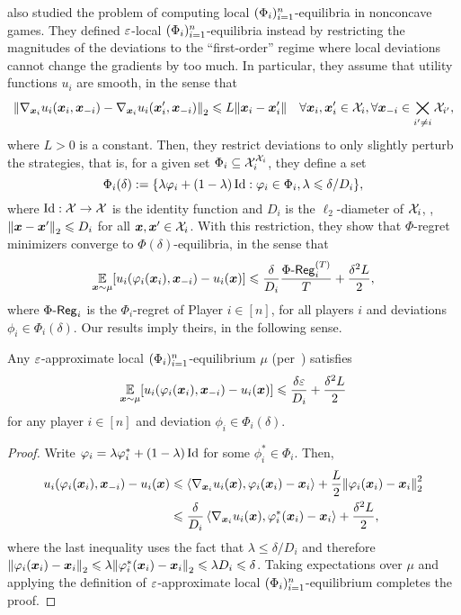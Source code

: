 \citet{Cai24:Tractable} also studied the problem of computing local $(\Phi_i)_{i=1}^n$-equilibria in nonconcave games. They defined $\varepsilon$-local $(\Phi_i)_{i=1}^n$-equilibria instead by restricting the magnitudes of the deviations to the ``first-order'' regime where local deviations cannot change the gradients by too much. In particular, they assume that utility functions $u_i$ are smooth, in the sense that
\begin{align*}
    \norm{\nabla_{{\bm{x}}_i} u_i({\bm{x}}_i, {\bm{x}}_{-i}) - \nabla_{{\bm{x}}_i} u_i({\bm{x}}_i', {\bm{x}}_{-i})}_2 \leqslant L \norm{{\bm{x}}_i - {\bm{x}}_i'} \quad \forall {\bm{x}}_i, {\bm{x}}_i' \in {\mathcal{X}}_i, \forall {\bm{x}}_{-i} \in \bigtimes_{i' \neq i} {\mathcal{X}}_{i'},
\end{align*}
where $L > 0$ is a constant. Then, they restrict deviations to only slightly perturb the strategies, that is, for a given set $\Phi_i \subseteq {\mathcal{X}}_i^{{\mathcal{X}}_i}$, they define a set $$\Phi_{i}(\delta) := \{ \lambda \varphi_i + (1 - \lambda) \operatorname{Id} : \varphi_i \in \Phi_i, \lambda \leqslant \delta / D_i \},$$ where $\operatorname{Id} : {\mathcal{X}} \to {\mathcal{X}}$ is the identity function and $D_i$ is the $\ell_2$-diameter of ${\mathcal{X}}_i$, \ie, $\norm{{\bm{x}} - {\bm{x}}'}_2 \leqslant D_i$ for all ${\bm{x}}, {\bm{x}}' \in {\mathcal{X}}_i$. With this restriction, they show \citep[Lemma~1 and Theorem~10]{Cai24:Tractable} that $\Phi$-regret minimizers converge to $\Phi(\delta)$-equilibria, in the sense that
\begin{align*}
    \operatorname*{\mathbb E}_{{\bm{x}}\sim\mu}[u_i(\varphi_i({\bm{x}}_i), {\bm{x}}_{-i}) - u_i({\bm{x}})] \leqslant \frac{\delta}{D_i}\frac{\Phi\text{-}\mathsf{Reg}_i^{(T)}}{T}+\frac{\delta^2 L}{2},
\end{align*}
where $\Phi\text{-}\mathsf{Reg}_i$ is the $\Phi_i$-regret of Player $i \in [n]$, for all players $i$ and deviations $\phi_i \in \Phi_i(\delta)$. Our results imply theirs, in the following sense.

\begin{proposition}
    \label{prop:localPhi}
    Any $\varepsilon$-approximate local $(\Phi_i)_{i=1}^n$-equilibrium $\mu$ (per~) satisfies
    $$\operatorname*{\mathbb E}_{{\bm{x}}\sim\mu}[u_i(\varphi_i({\bm{x}}_i), {\bm{x}}_{-i}) - u_i({\bm{x}})] \leqslant \frac{\delta\varepsilon}{D_i}+\frac{\delta^2 L}{2}$$
    for any player $i \in [n]$ and deviation $\phi_i \in \Phi_i(\delta)$.
\end{proposition}
\begin{proof}
Write $\varphi_i = \lambda \varphi_i^* + (1 - \lambda) \operatorname{Id}$ for some $\phi_i^* \in \Phi_i$. Then,
    \begin{align*}
        u_i(\phi_i(\vx_i), \vx_{-i}) - u_i(\vx) &\le \ip{\grad_{\vx_i} u_i(\vx), \phi_i(\vx_i) - \vx_i} + \frac{L}{2} \norm{\phi_i(\vx_i) - \vx_i}_2^2 \\
        &\le \frac{\delta}{D_i} \ip{\grad_{\vx_i} u_i(\vx), \phi_i^*(\vx_i) - \vx_i} + \frac{\delta^2 L}{2},
    \end{align*}
    where the last inequality uses the fact that $\lambda \le \delta/D_i$ and therefore $\norm{\varphi_i({\bm{x}}_i) - {\bm{x}}_i}_2 \leqslant \lambda \norm{\varphi_i^*({\bm{x}}_i) - {\bm{x}}_i}_2 \leqslant \lambda D_i \leqslant \delta$.
    Taking expectations over $\mu$ and applying the definition of $\varepsilon$-approximate local $(\Phi_i)_{i=1}^n$-equilibrium completes the proof.
\end{proof}

